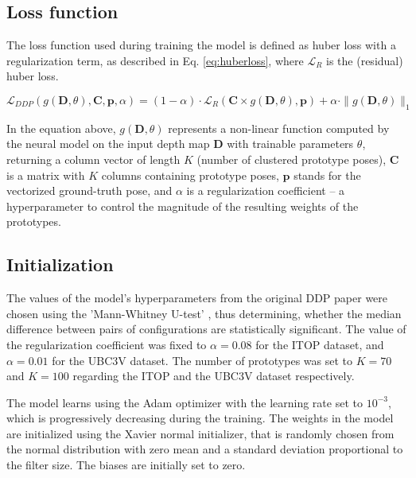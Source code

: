 \subsection{Loss function}

The loss function used during training the model is defined as huber loss with a regularization term, as described in Eq. \ref{eq:huberloss}, where $\mathcal{L}_R$ is the (residual) huber loss.\par

\begin{equation}
\mathcal{L}_{DDP}(g(\mathbf{D}, \theta), \mathbf{C}, \mathbf{p}, \alpha) = (1 - \alpha) \cdot \mathcal{L}_R(\mathbf{C} \times g(\mathbf{D}, \theta), \mathbf{p}) + \alpha \cdot \|g(\mathbf{D}, \theta)\|_1 \label{eq:huberloss}
\end{equation} 

\noindent In the equation above, $g(\mathbf{D}, \theta)$ represents a non-linear function computed by the neural model on the input depth map $\mathbf{D}$ with trainable parameters $\theta$, returning a column vector of length $K$ (number of clustered prototype poses), $\mathbf{C}$ is a matrix with $K$ columns containing prototype poses, $\mathbf{p}$ stands for the vectorized ground-truth pose,  and $\alpha$ is a regularization coefficient  – a hyperparameter to control the magnitude of the resulting weights of the prototypes.

\subsection{Initialization}

The values of the model's hyperparameters from the original DDP paper were chosen using the 'Mann-Whitney U-test' \cite{mann1947}, thus determining, whether the median difference between pairs of configurations are statistically significant. The value of the regularization coefficient was fixed to $\alpha = 0.08$ for the ITOP dataset, and $\alpha = 0.01$ for the UBC3V dataset. The number of prototypes was set to $K=70$ and $K=100$ regarding the ITOP and the UBC3V dataset respectively.\par
\vspace{5mm}
\noindent
The model learns using the Adam optimizer with the learning rate set to $10^{-3}$, which is progressively decreasing during the training.  The weights in the model are initialized using the Xavier normal initializer, that is randomly chosen from the normal distribution with zero mean and a standard deviation proportional to the filter size. The biases are initially set to zero.

